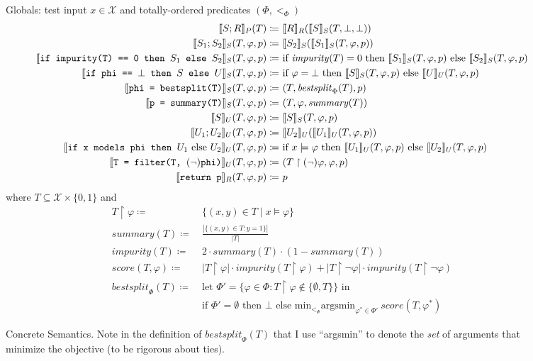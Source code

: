 \begin{figure}
\centering
Globals: test input $x \in \mathcal{X}$ and totally-ordered predicates $(\Phi, <_\Phi)$
\begin{align*}
\den[P]{S ; R}(T) \coloneqq&~
\den[R]{R}(\den[S]{S}(T, \bot, \bot)) \\
%
\den[S]{S_1 ; S_2}(T, \varphi, p) \coloneqq&~
\den[S]{S_2}(\den[S]{S_1}(T, \varphi, p)) \\
%
\den[S]{\iteimpuritynode{S_1}{S_2}}(T, \varphi, p) \coloneqq&~
\text{if } \mathit{impurity}(T) = 0 \text{ then } \den[S]{S_1}(T, \varphi, p)
\text{ else } \den[S]{S_2}(T, \varphi, p) \\
%
\den[S]{\itetrivialnode{S}{U}}(T, \varphi, p) \coloneqq&~
\text{if } \varphi = \bot \text{ then } \den[S]{S}(T, \varphi, p)
\text{ else } \den[U]{U}(T, \varphi, p) \\
%
\den[S]{\bestsplitnode}(T, \varphi, p) \coloneqq&~
(T, \mathit{bestsplit}_\Phi(T), p) \\
%
\den[S]{\summarynode}(T, \varphi, p) \coloneqq&~
(T, \varphi, \mathit{summary}(T)) \\
%
\den[U]{S}(T, \varphi, p) \coloneqq&~
\den[S]{S}(T, \varphi, p) \\
%
\den[U]{U_1 ; U_2}(T, \varphi, p) \coloneqq&~
\den[U]{U_2}(\den[U]{U_1}(T, \varphi, p)) \\
%
\den[U]{\itemodelsnode{U_1}{U_2}}(T, \varphi, p) \coloneqq&~
\text{if } x \models \varphi \text{ then } \den[U]{U_1}(T, \varphi, p)
\text{ else } \den[U]{U_2}(T, \varphi, p) \\
%
\den[U]{\filternode[(\lnot)]}(T, \varphi, p) \coloneqq&~
(T \upharpoonright (\lnot)\varphi, \varphi, p) \\
%
\den[R]{\returnnode}(T, \varphi, p) \coloneqq&~ p
\end{align*}
where $T \subseteq \mathcal{X} \times \{0,1\}$ and
\begin{align*}
T \upharpoonright \varphi \coloneqq&~ \{(x,y) \in T \mid x \models \varphi\} \\
\mathit{summary}(T) \coloneqq&~ \frac{|\{(x,y) \in T : y = 1\}|}{|T|} \\
\mathit{impurity}(T) \coloneqq&~ 2 \cdot \mathit{summary}(T) \cdot (1-\mathit{summary}(T)) \\
\mathit{score}(T, \varphi) \coloneqq&~
|T \upharpoonright \varphi| \cdot \mathit{impurity}(T \upharpoonright \varphi) +
|T \upharpoonright \lnot\varphi| \cdot \mathit{impurity}(T \upharpoonright \lnot\varphi) \\
\mathit{bestsplit}_\Phi(T) \coloneqq&~
\text{let } \Phi' = \{\varphi \in \Phi : T \upharpoonright \varphi \not\in \{\emptyset, T\}\} \text{ in } \\
&~\text{if } \Phi' = \emptyset \text{ then } \bot \text{ else }
\text{min}_{<_\Phi} \text{argsmin}_{\varphi^* \in \Phi'}~\mathit{score}(T, \varphi^*)
\end{align*}
\caption{Concrete Semantics.
Note in the definition of $\mathit{bestsplit}_\Phi(T)$
that I use ``argsmin'' to denote the \emph{set} of arguments
that minimize the objective (to be rigorous about ties).}
\label{fig:concrete}
\end{figure}

